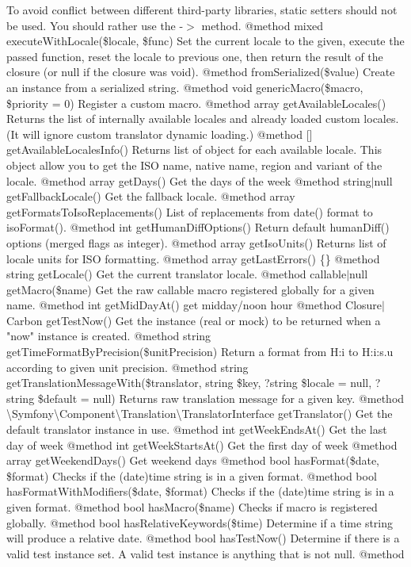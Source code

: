 \begin{DoxyRefList}
To avoid conflict between different third-\/party libraries, static setters should not be used. You should rather use the -\/\texorpdfstring{$>$}{>} method. @method mixed execute\+With\+Locale(\$locale, \$func) Set the current locale to the given, execute the passed function, reset the locale to previous one, then return the result of the closure (or null if the closure was void). @method  from\+Serialized(\$value) Create an instance from a serialized string. @method void generic\+Macro(\$macro, \$priority = 0) Register a custom macro. @method array get\+Available\+Locales() Returns the list of internally available locales and already loaded custom locales. (It will ignore custom translator dynamic loading.) @method \mbox{[}\mbox{]} get\+Available\+Locales\+Info() Returns list of  object for each available locale. This object allow you to get the ISO name, native name, region and variant of the locale. @method array get\+Days() Get the days of the week @method string\texorpdfstring{$\vert$}{|}null get\+Fallback\+Locale() Get the fallback locale. @method array get\+Formats\+To\+Iso\+Replacements() List of replacements from date() format to iso\+Format(). @method int get\+Human\+Diff\+Options() Return default human\+Diff() options (merged flags as integer). @method array get\+Iso\+Units() Returns list of locale units for ISO formatting. @method array get\+Last\+Errors() \{\} @method string get\+Locale() Get the current translator locale. @method callable\texorpdfstring{$\vert$}{|}null get\+Macro(\$name) Get the raw callable macro registered globally for a given name. @method int get\+Mid\+Day\+At() get midday/noon hour @method Closure\texorpdfstring{$\vert$}{|}\+Carbon get\+Test\+Now() Get the  instance (real or mock) to be returned when a "{}now"{} instance is created. @method string get\+Time\+Format\+By\+Precision(\$unit\+Precision) Return a format from H\+:i to H\+:i\+:s.\+u according to given unit precision. @method string get\+Translation\+Message\+With(\$translator, string \$key, ?string \$locale = null, ?string \$default = null) Returns raw translation message for a given key. @method \textbackslash{}\+Symfony\textbackslash{}\+Component\textbackslash{}\+Translation\textbackslash{}\+Translator\+Interface get\+Translator() Get the default translator instance in use. @method int get\+Week\+Ends\+At() Get the last day of week @method int get\+Week\+Starts\+At() Get the first day of week @method array get\+Weekend\+Days() Get weekend days @method bool has\+Format(\$date, \$format) Checks if the (date)time string is in a given format. @method bool has\+Format\+With\+Modifiers(\$date, \$format) Checks if the (date)time string is in a given format. @method bool has\+Macro(\$name) Checks if macro is registered globally. @method bool has\+Relative\+Keywords(\$time) Determine if a time string will produce a relative date. @method bool has\+Test\+Now() Determine if there is a valid test instance set. A valid test instance is anything that is not null. @method  
\end{DoxyRefList}
